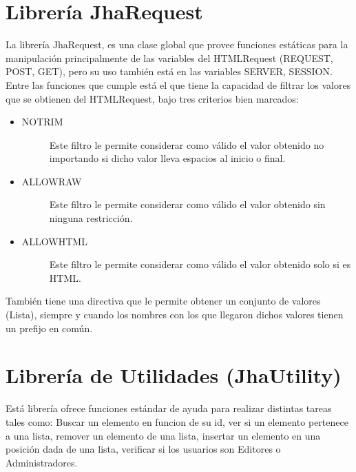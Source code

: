 \section{Librer\'ia JhaRequest}
La librer\'ia JhaRequest, es una clase global que provee funciones est\'aticas para la manipulaci\'on principalmente de las variables del HTMLRequest (REQUEST, POST, GET), pero su uso tambi\'en est\'a en las variables SERVER, SESSION.\\
Entre las funciones que cumple est\'a el que tiene la capacidad de filtrar los valores que se obtienen del HTMLRequest, bajo tres criterios bien marcados:
\begin{itemize}
\item \begin{description}
	\item[NOTRIM] Este filtro le permite considerar como v\'alido el valor obtenido no importando si dicho valor lleva espacios al inicio o final.
	\end{description}
\item \begin{description}
	\item[ALLOWRAW] Este filtro le permite considerar como v\'alido el valor obtenido sin ninguna restricci\'on.
	\end{description}
\item \begin{description}
	\item[ALLOWHTML] Este filtro le permite considerar como v\'alido el valor obtenido solo si es HTML.
	\end{description}
\end{itemize}
Tambi\'en tiene una directiva que le permite obtener un conjunto de valores (Lista), siempre y cuando los nombres con los que llegaron dichos valores tienen un prefijo en com\'un.

\section{Librer\'ia de Utilidades (JhaUtility)}
Est\'a librer\'ia ofrece funciones est\'andar de ayuda para realizar distintas tareas tales como: Buscar un elemento en funcion de su id, ver si un elemento pertenece a una lista, remover un elemento de una lista, insertar un elemento en una posici\'on dada de una lista, verificar si los usuarios son Editores o Administradores.



